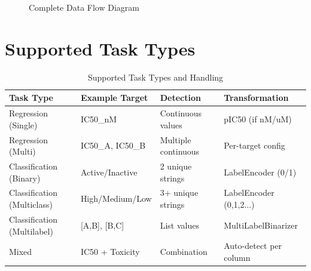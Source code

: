 \documentclass[11pt,a4paper]{article}
\begin{document}
\begin{figure}[H]
\caption{Complete Data Flow Diagram}
\end{figure}

\section{Supported Task Types}

\begin{table}[H]
\centering
\caption{Supported Task Types and Handling}
\begin{tabular}{@{}llll@{}}
\toprule
\textbf{Task Type} & \textbf{Example Target} & \textbf{Detection} & \textbf{Transformation} \\
\midrule
Regression (Single) & IC50\_nM & Continuous values & pIC50 (if nM/uM) \\
Regression (Multi) & IC50\_A, IC50\_B & Multiple continuous & Per-target config \\
Classification (Binary) & Active/Inactive & 2 unique strings & LabelEncoder (0/1) \\
Classification (Multiclass) & High/Medium/Low & 3+ unique strings & LabelEncoder (0,1,2...) \\
Classification (Multilabel) & [A,B], [B,C] & List values & MultiLabelBinarizer \\
Mixed & IC50 + Toxicity & Combination & Auto-detect per column \\
\bottomrule
\end{tabular}
\end{table}

\end{document}
